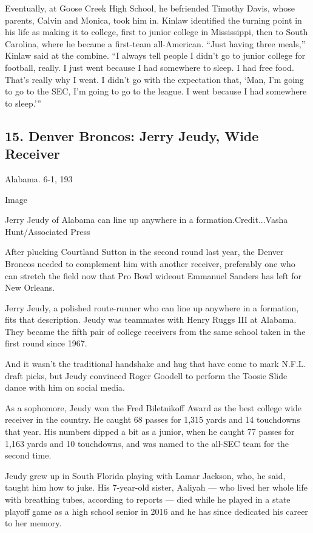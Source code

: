 Eventually, at Goose Creek High School, he befriended Timothy Davis,
whose parents, Calvin and Monica, took him in. Kinlaw identified the
turning point in his life as making it to college, first to junior
college in Mississippi, then to South Carolina, where he became a
first-team all-American. ``Just having three meals,'' Kinlaw said at the
combine. ``I always tell people I didn't go to junior college for
football, really. I just went because I had somewhere to sleep. I had
free food. That's really why I went. I didn't go with the expectation
that, `Man, I'm going to go to the SEC, I'm going to go to the league. I
went because I had somewhere to sleep.'''

\hypertarget{15-denver-broncos-jerry-jeudy-wide-receiver}{%
\subsection{15. Denver Broncos: Jerry Jeudy, Wide
Receiver}\label{15-denver-broncos-jerry-jeudy-wide-receiver}}

Alabama. 6-1, 193

Image

Jerry Jeudy of Alabama can line up anywhere in a
formation.Credit...Vasha Hunt/Associated Press

After plucking Courtland Sutton in the second round last year, the
Denver Broncos needed to complement him with another receiver,
preferably one who can stretch the field now that Pro Bowl wideout
Emmanuel Sanders has left for New Orleans.

Jerry Jeudy, a polished route-runner who can line up anywhere in a
formation, fits that description. Jeudy was teammates with Henry Ruggs
III at Alabama. They became the fifth pair of college receivers from the
same school taken in the first round since 1967.

And it wasn't the traditional handshake and hug that have come to mark
N.F.L. draft picks, but Jeudy convinced Roger Goodell to perform the
Toosie Slide dance with him on social media.

As a sophomore, Jeudy won the Fred Biletnikoff Award as the best college
wide receiver in the country. He caught 68 passes for 1,315 yards and 14
touchdowns that year. His numbers dipped a bit as a junior, when he
caught 77 passes for 1,163 yards and 10 touchdowns, and was named to the
all-SEC team for the second time.

Jeudy grew up in South Florida playing with Lamar Jackson, who, he said,
taught him how to juke. His 7-year-old sister, Aaliyah --- who lived her
whole life with breathing tubes, according to reports --- died while he
played in a state playoff game as a high school senior in 2016 and he
has since dedicated his career to her memory.

